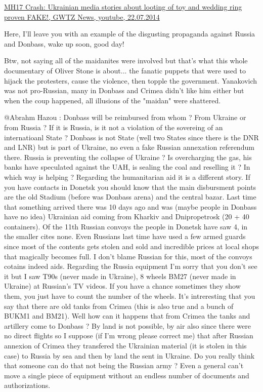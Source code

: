 \begin{itemize}
\begin{itemize}

\href{http://youtu.be/kZBSGorpLNc}{%
MH17 Crash: Ukrainian media stories about looting of toy and wedding ring proven FAKE!, %
GWTZ News, youtube, 22.07.2014%
}

Here, I'll leave you with an example of the disgusting propaganda against
Russia and Donbass, wake up soon, good day!


Btw, not saying all of the maidanites were involved but that's what this whole
documentary of Oliver Stone is about... the fanatic puppets that were used to
hijack the protesters, cause the violence, then topple the government.
Yanakovich was not pro-Russian, many in Donbass and Crimea didn't like him
either but when the coup happened, all illusions of the "maidan" were
shattered.



@Abrahm Hazou : Donbass will be reimbursed from whom ? From Ukraine or from
Russia ? If it is Russia, is it not a violation of the sovereing of an
internatioanl State ? Donbass is not State (well two States since there is the
DNR and LNR) but is part of Ukraine, no even a fake Russian annexation
referendum there. Russia is preventing the collapse of Ukraine ? Is
overcharging the gas, his banks have speculated against the UAH, is sealing the
coal and reselling it ? In which way is helping ? Regarding the humanitarian
aid it is a different story. If you have contacts in Donetsk you should know
that the main disbursment points are the old Stadium (before was Donbass arena)
and the central bazar. Last time that something arrived there was 10 days ago
and was (maybe people in Donbass have no idea) Ukrainian aid coming from
Kharkiv and Dnipropetrosk (20 + 40 containers). Of the 11th Russian convoys the
people in Donetsk have saw 4, in the smaller cites none. Even Russians last
time have used a few armed guards since most of the contents gets stolen and
sold and incredible prices at local shops that magically becomes full. I don't
blame Russian for this, most of the convoys cotains indeed aids. Regarding the
Russia equipment I'm sorry that you don't see it but I saw T90s (never made in
Ukraine), 8 wheels BM27 (never made in Ukraine) at Russian's TV videos. If you
have a chance sometimes they show them, you just have to count the number of
the wheels. It's intreresting that you say that there are old tanks from Crimea
(this is also true and a bunch of BUKM1 and BM21). Well how can it happens that
from Crimea the tanks and artillery come to Donbass ? By land is not possible,
by air also since there were no direct flights so I suppose (if I'm wrong
please correct me) that after Russian annexion of Crimea they transfered the
Ukrainian material (it is stolen in this case) to Russia by sea and then by
land the sent in Ukraine. Do you really think that someone can do that not
being the Russian army ? Even a general can't move a single piece of equipment
without an endless number of documents and authorizations.


\end{itemize}
\end{itemize}
